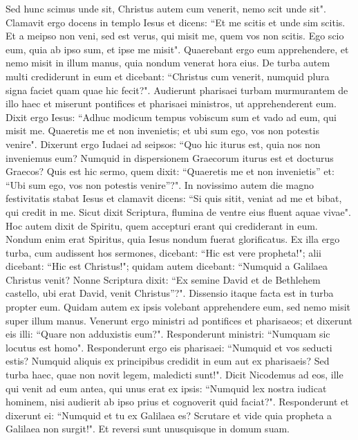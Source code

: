\begin{biblechapter}
\verse Sed hunc scimus unde sit, Christus autem cum venerit, nemo scit unde sit". 
\verse Clamavit ergo docens in templo Iesus et dicens: “Et me scitis et unde sim scitis. Et a meipso non veni, sed est verus, qui misit me, quem vos non scitis. 
\verse Ego scio eum, quia ab ipso sum, et ipse me misit". 
\verse Quaerebant ergo eum apprehendere, et nemo misit in illum manus, quia nondum venerat hora eius. 
\verse De turba autem multi crediderunt in eum et dicebant: “Christus cum venerit, numquid plura signa faciet quam quae hic fecit?". 
\verse Audierunt pharisaei turbam murmurantem de illo haec et miserunt pontifices et pharisaei ministros, ut apprehenderent eum. 
\verse Dixit ergo Iesus: “Adhuc modicum tempus vobiscum sum et vado ad eum, qui misit me. 
\verse Quaeretis me et non invenietis; et ubi sum ego, vos non potestis venire". 
\verse Dixerunt ergo Iudaei ad seipsos: “Quo hic iturus est, quia nos non inveniemus eum? Numquid in dispersionem Graecorum iturus est et docturus Graecos? 
\verse Quis est hic sermo, quem dixit: “Quaeretis me et non invenietis” et: “Ubi sum ego, vos non potestis venire”?". 
\verse In novissimo autem die magno festivitatis stabat Iesus et clamavit dicens: “Si quis sitit, veniat ad me et bibat, 
\verse qui credit in me. Sicut dixit Scriptura, flumina de ventre eius fluent aquae vivae". 
\verse Hoc autem dixit de Spiritu, quem accepturi erant qui crediderant in eum. Nondum enim erat Spiritus, quia Iesus nondum fuerat glorificatus. 
\verse Ex illa ergo turba, cum audissent hos sermones, dicebant: “Hic est vere propheta!"; 
\verse alii dicebant: “Hic est Christus!"; quidam autem dicebant: “Numquid a Galilaea Christus venit? 
\verse Nonne Scriptura dixit: “Ex semine David et de Bethlehem castello, ubi erat David, venit Christus”?". 
\verse Dissensio itaque facta est in turba propter eum. 
\verse Quidam autem ex ipsis volebant apprehendere eum, sed nemo misit super illum manus. 
\verse Venerunt ergo ministri ad pontifices et pharisaeos; et dixerunt eis illi: “Quare non adduxistis eum?". 
\verse Responderunt ministri: “Numquam sic locutus est homo". 
\verse Responderunt ergo eis pharisaei: “Numquid et vos seducti estis? 
\verse Numquid aliquis ex principibus credidit in eum aut ex pharisaeis? 
\verse Sed turba haec, quae non novit legem, maledicti sunt!".  
\verse Dicit Nicodemus ad eos, ille qui venit ad eum antea, qui unus erat ex ipsis:  
\verse “Numquid lex nostra iudicat hominem, nisi audierit ab ipso prius et cognoverit quid faciat?". 
\verse Responderunt et dixerunt ei: “Numquid et tu ex Galilaea es? Scrutare et vide quia propheta a Galilaea non surgit!". 
\verse Et reversi sunt unusquisque in domum suam. 
\end{biblechapter}

